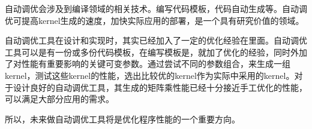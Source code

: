 自动调优会涉及到编译领域的相关技术。编写代码模板，代码自动生成等。自动调优可提高kernel生成的速度，加快实际应用的部署，是一个具有研究价值的领域。

自动调优工具在设计和实现时，其实已经加入了一定的优化经验在里面。自动调优工具可以是有一份或多份代码模板，在编写模板是，就加了优化的经验，同时外加了对性能有重要影响的关键可变参数。通过尝试不同的参数组合，来生成一组kernel，测试这些kernel的性能，选出比较优的kernel作为实际中采用的kernel。对于设计良好的自动调优工具，其生成的矩阵乘性能已经十分接近手工优化的性能，可以满足大部分应用的需求。

所以，未来做自动调优工具将是优化程序性能的一个重要方向。
